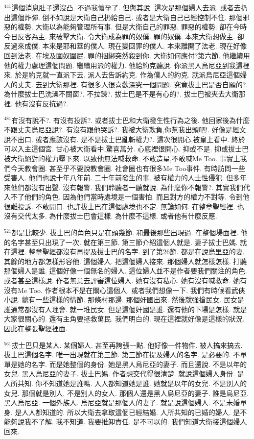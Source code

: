 \documentclass{book}
\begin{document}
$^{441}$這個消息肚子還沒凸.
不過我懷孕了.
但與其說.
這次是那個婦人去派.
或者去扔出這個炸彈.
倒不如說是大衛自己扔給自己.
或者是大衛自己已經控制不住.
那個邪惡的權勢.
大衛以為能夠管理所有事.
但是大衛自己的罪惡.
罪惡的權勢.
卻在今時今日反客為主.
來破擊大衛.
令大衛成為罪的奴僕.
罪的奴僕.
本來大衛想做主.
卻反過來成僕.
本來是耶和華的僕人.
現在變回罪的僕人.
本來離開了法老.
現在好像回到法老.
在埃及圍奴圍屁.
罪的捆綁突然殺到你.
大衛如何應付?第六節.
他繼續用他的權力處理這個問題.
繼續用派的權力.
他給約克聽說.
你派黑人烏尼亞到我這裡來.
於是約克就一直派下去.
派人去告訴約克.
作為僕人的約克.
就派烏尼亞這個婦人的丈夫.
去到大衛那裡.
有很多人很喜歡深究一個問題.
究竟拔士巴是否自願的?.
為什麼拔士巴洗澡不關窗?.
不拉鍊?.
拔士巴是不是有心的?.
拔士巴被夾去大衛那裡.
他有沒有反抗過?.

$^{481}$有沒有說不?.
有沒有投訴?.
或者拔士巴和大衛發生性行為之後.
他回家後為什麼不跟丈夫烏尼亞說?.
有沒有跟他哭訴?.
我被大衛欺負,你幫我出頭吧!.
好像是經文說不出口.
或者應該沒有.
是不是拔士巴亂斬權力?.
這次很開心,被皇上看中.
終於可以入主這個宮.
甘心被大衛看中,驚喜萬分.
心底裡很開心.
抑或不是.
抑或拔士巴被大衛絕對的權力壓下來.
以致他無法喊救命.
不敢造星,不敢喊Me Too.
事實上我們今天教會圈.
甚至乎不要說教會圈.
社會圈也有很多Me Too事件.
有時訪問一些受害人.
他們也說十年八年前.
二十年前發生的事.
被有權力的人士性侵犯.
但多年來他們都沒有出聲.
沒有報警.
我們聆聽者一聽就說.
為什麼你不報警?.
其實我們代入不了他們的角色.
因為他們當時處境是一個害怕.
而且對方的權力不對等.
令到他很難投訴.
不敢開口.
也許拔士巴在這個處境也不定.
無論如何.
在整章聖經裡.
也沒有交代太多.
為什麼拔士巴會這樣.
為什麼不這樣.
或者他有什麼反應.

$^{521}$都是比較少.
拔士巴的角色只是在頭幾節.
和最後那些出現過.
在整個場面裡.
他的名字甚至只出現了一次.
就在第三節.
第三節介紹這個人就是.
妻子拔士巴媽.
就在這裡.
整章聖經都沒有再提及拔士巴的名字.
到了第26節.
都是在說烏里亞的妻.
其餘的地方都怎樣形容他.
這個婦人.
把這個婦人接來.
那個婦人就怎樣怎樣.
打聽那個婦人是誰.
這個好像一個無名的婦人.
這位婦人並不是作者要我們關注的角色.
或者甚至這樣說.
作者無意去評審這位婦人.
她有沒有私心.
她有沒有喊救命.
她有沒有Me Too.
作者根本不是在關心這個人.
或者我們想像一下.
我們有時候看武俠小說.
總有一些這樣的情節.
那條村那邊.
那個奸國出來.
然後就強搶民女.
民女是誰通常都沒有人理會.
就一堆民女.
但是這個奸國是誰.
還有他的下場是怎樣.
就是大家很關心的.
還有主角要拯救萬民.
我們明白的.
現在這裡就好像是這樣的狀況.
因此在整張聖經裡面.

$^{561}$拔士巴只是某人.
某個婦人.
甚至再誇張一點.
他好像一件物件.
被人搞來搞去.
拔士巴這個名字.
唯一出現就在第三節.
第三節在提及婦人的名字.
是必要的.
不單單是她的名字.
而是她整個的身份.
她是黑人烏尼亞的妻子.
而且還說.
不是以年的女兒.
黑人烏尼亞的妻子.
拔士巴媽.
作者想交代得很清楚.
就說這個婦人身份.
是人所共知.
你不知道她是誰嗎.
人人都知道她是誰.
她就是以年的女兒.
不是別人的女兒.
那個就是別人.
不是別人的女人.
那個人還是黑人烏尼亞的妻子.
誰是烏尼亞.
黑人烏尼亞.
一個外族人.
烏尼亞就是那個人的妻子.
就是說這個婦人.
不是未婚單身.
是人人都知道的.
所以大衛去拿取這個已經結婚.
人所共知的已婚的婦人.
是不能夠說我不了解.
我不知道.
我要推卸責任.
是不可以的.
我們知道大衛接這個婦人回來.
\end{document}

